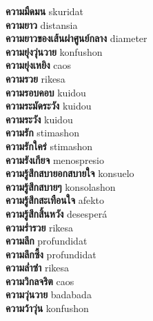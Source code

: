 \textbf{ ความมืดมน  } skuridat \\
\textbf{ ความยาว  } distansia \\
\textbf{ ความยาวของเส้นผ่าศูนย์กลาง  } diameter \\
\textbf{ ความยุ่งวุ่นวาย  } konfushon \\
\textbf{ ความยุ่งเหยิง  } caos \\
\textbf{ ความรวย  } rikesa \\
\textbf{ ความรอบคอบ  } kuidou \\
\textbf{ ความระมัดระวัง  } kuidou \\
\textbf{ ความระวัง  } kuidou \\
\textbf{ ความรัก  } stimashon \\
\textbf{ ความรักใคร่  } stimashon \\
\textbf{ ความรังเกียจ  } menospresio \\
\textbf{ ความรู้สึกสบายอกสบายใจ  } konsuelo \\
\textbf{ ความรู้สึกสบายๆ  } konsolashon \\
\textbf{ ความรู้สึกสะเทือนใจ  } afekto \\
\textbf{ ความรู้สึกสิ้นหวัง  } desesperá \\
\textbf{ ความร่ำรวย  } rikesa \\
\textbf{ ความลึก  } profundidat \\
\textbf{ ความลึกซึ้ง  } profundidat \\
\textbf{ ความล่ำซำ  } rikesa \\
\textbf{ ความวิกลจริต  } caos \\
\textbf{ ความวุ่นวาย  } badabada \\
\textbf{ ความว้าวุ่น  } konfushon \\
